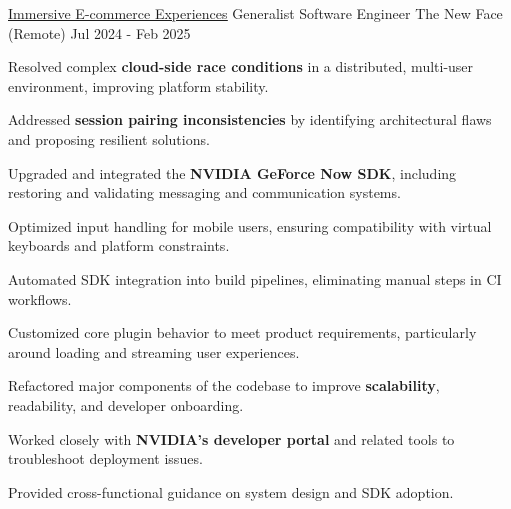 
\begin{cventries}

  \cventry
    {\href{https://www.thenewface.io/}{\underline{Immersive E-commerce Experiences}}}
    {Generalist Software Engineer}
    {The New Face (Remote)}
    {Jul 2024 - Feb 2025}
    {
      \begin{cvitems}
        \item {Resolved complex \textbf{cloud-side race conditions} in a distributed, multi-user environment, improving platform stability.}
        \item {Addressed \textbf{session pairing inconsistencies} by identifying architectural flaws and proposing resilient solutions.}
        \item {Upgraded and integrated the \textbf{NVIDIA GeForce Now SDK}, including restoring and validating messaging and communication systems.}
        \item {Optimized input handling for mobile users, ensuring compatibility with virtual keyboards and platform constraints.}
        \item {Automated SDK integration into build pipelines, eliminating manual steps in CI workflows.}
        \item {Customized core plugin behavior to meet product requirements, particularly around loading and streaming user experiences.}
        \item {Refactored major components of the codebase to improve \textbf{scalability}, readability, and developer onboarding.}
        \item {Worked closely with \textbf{NVIDIA's developer portal} and related tools to troubleshoot deployment issues.}
        \item {Provided cross-functional guidance on system design and SDK adoption.}
      \end{cvitems}
    }


\end{cventries}
